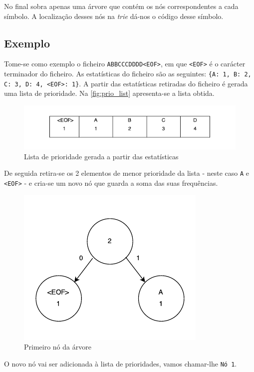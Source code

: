 \documentclass[a4paper]{article}
\begin{document}
	No final sobra apenas uma árvore que contém os nós correspondentes a cada símbolo. A localização desses nós na \textit{trie} dá-nos o código desse símbolo.

	\subsection*{Exemplo}

	Tome-se como exemplo o ficheiro \texttt{ABBCCCDDDD<EOF>}, em que \texttt{<EOF>} é o carácter terminador do ficheiro. As estatísticas do ficheiro são as seguintes: \texttt{\{A: 1, B: 2, C: 3, D: 4, <EOF>: 1\}}. A partir das estatísticas retiradas do ficheiro é gerada uma lista de prioridade. Na \autoref{fig:prio_list} apresenta-se a lista obtida.

  \begin{figure}[H]
    \centering
    \includegraphics[width=.65\textwidth]{img/prio_list}
    \caption{Lista de prioridade gerada a partir das estatísticas}
    \label{fig:prio_list}
  \end{figure}

  De seguida retira-se os 2 elementos de menor prioridade da lista - neste caso \texttt{A} e \texttt{<EOF>} - e cria-se um novo nó que guarda a soma das suas frequências.

  \begin{figure}[H]
    \centering
    \includegraphics[width=.65\textwidth]{img/trie_1}
    \caption{Primeiro nó da árvore}
    \label{fig:trie_1}
  \end{figure}

  O novo nó vai ser adicionada à lista de prioridades, vamos chamar-lhe \texttt{Nó 1}.
\end{document}
